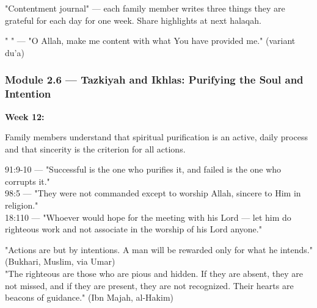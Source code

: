 \documentclass[11pt,a4paper]{article}
\begin{document}
\begin{activitybox} "Contentment journal" --- each family member writes three things they are grateful for each day for one week. Share highlights at next halaqah. \end{activitybox}

\begin{duabox} "   " --- "O Allah, make me content with what You have provided me." (variant du'a) \end{duabox}

\vspace{6pt}\noindent{\color{border}\rule{\textwidth}{0.5pt}}\vspace{6pt}

\subsubsection*{Module 2.6 --- Tazkiyah and Ikhlas: Purifying the Soul and Intention}
\textbf{Week 12:} 

\begin{outcomebox} Family members understand that spiritual purification is an active, daily process and that sincerity is the criterion for all actions. \end{outcomebox}

\begin{quranbox} 91:9-10 --- "Successful is the one who purifies it, and failed is the one who corrupts it." \\ 98:5 --- "They were not commanded except to worship Allah, sincere to Him in religion." \\ 18:110 --- "Whoever would hope for the meeting with his Lord --- let him do righteous work and not associate in the worship of his Lord anyone." \end{quranbox}

\begin{hadithbox} "Actions are but by intentions. A man will be rewarded only for what he intends." (Bukhari, Muslim, via Umar) \\ "The righteous are those who are pious and hidden. If they are absent, they are not missed, and if they are present, they are not recognized. Their hearts are beacons of guidance." (Ibn Majah, al-Hakim) \end{hadithbox}
\end{document}

